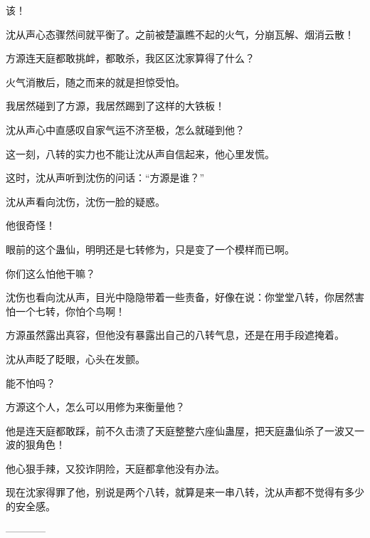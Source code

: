 \begin{this_body}
该！

沈从声心态骤然间就平衡了。之前被楚瀛瞧不起的火气，分崩瓦解、烟消云散！

方源连天庭都敢挑衅，都敢杀，我区区沈家算得了什么？

火气消散后，随之而来的就是担惊受怕。

我居然碰到了方源，我居然踢到了这样的大铁板！

沈从声心中直感叹自家气运不济至极，怎么就碰到他？

这一刻，八转的实力也不能让沈从声自信起来，他心里发慌。

这时，沈从声听到沈伤的问话：“方源是谁？”

沈从声看向沈伤，沈伤一脸的疑惑。

他很奇怪！

眼前的这个蛊仙，明明还是七转修为，只是变了一个模样而已啊。

你们这么怕他干嘛？

沈伤也看向沈从声，目光中隐隐带着一些责备，好像在说：你堂堂八转，你居然害怕一个七转，你怕个鸟啊！

方源虽然露出真容，但他没有暴露出自己的八转气息，还是在用手段遮掩着。

沈从声眨了眨眼，心头在发颤。

能不怕吗？

方源这个人，怎么可以用修为来衡量他？

他是连天庭都敢踩，前不久击溃了天庭整整六座仙蛊屋，把天庭蛊仙杀了一波又一波的狠角色！

他心狠手辣，又狡诈阴险，天庭都拿他没有办法。

现在沈家得罪了他，别说是两个八转，就算是来一串八转，沈从声都不觉得有多少的安全感。

------------

\end{this_body}

